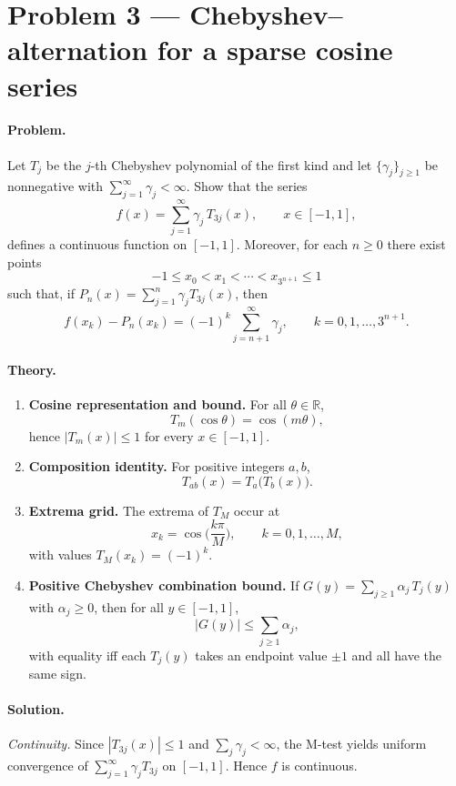 \documentclass[12pt,a4paper]{article}
\theoremstyle{plain}
\theoremstyle{definition}
\theoremstyle{remark}
\theoremstyle{remark}
\begin{document}
\section*{Problem 3 — Chebyshev–alternation for a sparse cosine series}

\paragraph{Problem.}
Let $T_j$ be the $j$-th Chebyshev polynomial of the first kind and let
$\{\gamma_j\}_{j\ge 1}$ be nonnegative with $\sum_{j=1}^\infty \gamma_j<\infty$.
Show that the series
\[
f(x)=\sum_{j=1}^{\infty}\gamma_j\,T_{3j}(x),\qquad x\in[-1,1],
\]
defines a continuous function on $[-1,1]$. Moreover, for each $n\ge 0$ there exist points
\[
-1\le x_0<x_1<\cdots<x_{3^{n+1}}\le 1
\]
such that, if $P_n(x)=\sum_{j=1}^{n}\gamma_j T_{3j}(x)$, then
\[
f(x_k)-P_n(x_k)=(-1)^k\sum_{j=n+1}^{\infty}\gamma_j,\qquad k=0,1,\dots,3^{n+1}.
\]

\paragraph{Theory.}
\begin{enumerate}[label=(\arabic*), leftmargin=*, itemsep=0.6em, topsep=0.4em]
	\item \textbf{Cosine representation and bound.}
	For all $\theta\in\mathbb{R}$,
	\[
	T_m(\cos\theta)=\cos(m\theta),
	\]
	hence $\lvert T_m(x)\rvert\le 1$ for every $x\in[-1,1]$.
	
	\item \textbf{Composition identity.}
	For positive integers $a,b$,
	\[
	T_{ab}(x)=T_a\!\big(T_b(x)\big).
	\]
	
	\item \textbf{Extrema grid.}
	The extrema of $T_M$ occur at
	\[
	x_k=\cos\!\Big(\frac{k\pi}{M}\Big), \qquad k=0,1,\dots,M,
	\]
	with values $T_M(x_k)=(-1)^k$.
	
	\item \textbf{Positive Chebyshev combination bound.}
	If $G(y)=\sum_{j\ge1}\alpha_j\,T_j(y)$ with $\alpha_j\ge 0$, then for all $y\in[-1,1]$,
	\[
	\lvert G(y)\rvert \le \sum_{j\ge1}\alpha_j,
	\]
	with equality iff each $T_j(y)$ takes an endpoint value $\pm 1$ and all have the same sign.
\end{enumerate}


\paragraph{Solution.}
\emph{Continuity.}
Since $|T_{3j}(x)|\le 1$ and $\sum_j\gamma_j<\infty$, the M-test yields uniform convergence
of $\sum_{j=1}^{\infty}\gamma_j T_{3j}$ on $[-1,1]$. Hence $f$ is continuous.
\end{document}
